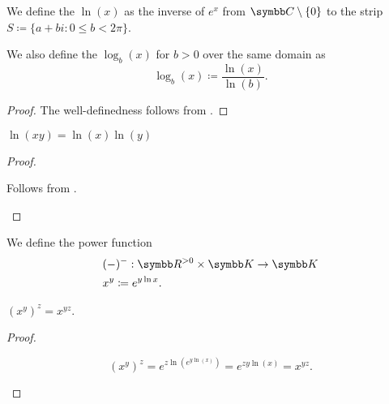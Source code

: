 \begin{definition}\label{def:logarithm}
  We define the  \( \ln(x) \) as the inverse of \( e^x \) from \( \BC \setminus \{ 0 \} \) to the strip \( S \coloneqq \{ a + bi \colon 0 \leq b < 2\pi \} \).

  We also define the  \( \log_b(x) \) for \( b > 0 \) over the same domain as
  \begin{equation*}
    \log_b(x) \coloneqq \frac {\ln(x)} {\ln(b)}.
  \end{equation*}
\end{definition}
\begin{proof}
  The well-definedness follows from .
\end{proof}

\begin{proposition}\label{thm:logarithm_properties}
  \mbox{}
  \begin{propenum}
     \( \ln(xy) = \ln(x) \ln(y) \)
  \end{propenum}
\end{proposition}
\begin{proof}\mbox{}
  \begin{description}
     Follows from .
  \end{description}
\end{proof}

\begin{definition}\label{def:power_function}
  We define the power function
  \begin{align*}
    &(-)^{-}: \BR^{>0} \times \BK \to \BK \\
    &x^y \coloneqq e^{y \ln x}.
  \end{align*}
\end{definition}

\begin{proposition}\label{thm:power_function_properties}
  \mbox{}
  \begin{propenum}
     \( (x^y)^z = x^{yz} \).
  \end{propenum}
\end{proposition}
\begin{proof}\mbox{}
  \begin{description}
    \begin{equation*}
      (x^y)^z
      =
      e^{z \ln(e^{y \ln(x)})}
      =
      e^{z y \ln(x)}
      =
      x^{yz}.
    \end{equation*}
  \end{description}
\end{proof}


